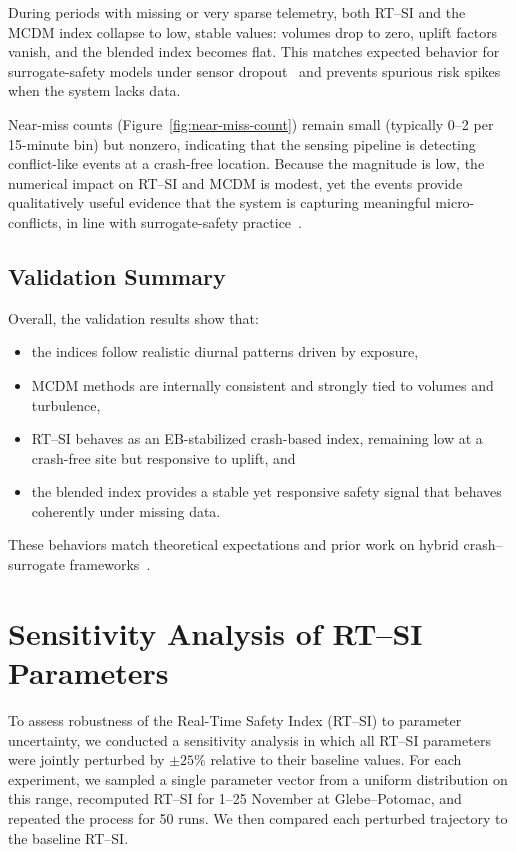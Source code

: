 \documentclass[conference]{IEEEtran}
\begin{document}
During periods with missing or very sparse telemetry, both RT--SI and the MCDM index
collapse to low, stable values: volumes drop to zero, uplift factors vanish, and the
blended index becomes flat. This matches expected behavior for surrogate-safety models
under sensor dropout~\cite{gettman2003ssam} and prevents spurious risk spikes when the
system lacks data.

Near-miss counts (Figure~\ref{fig:near-miss-count}) remain small (typically 0--2 per
15-minute bin) but nonzero, indicating that the sensing pipeline is detecting
conflict-like events at a crash-free location. Because the magnitude is low, the
numerical impact on RT--SI and MCDM is modest, yet the events provide qualitatively
useful evidence that the system is capturing meaningful micro-conflicts, in line with
surrogate-safety practice~\cite{schultz2025_surrogate, gettman2003ssam}.

\subsection{Validation Summary}

Overall, the validation results show that:
\begin{itemize}
    \item the indices follow realistic diurnal patterns driven by exposure,
    \item MCDM methods are internally consistent and strongly tied to volumes and
          turbulence,
    \item RT--SI behaves as an EB-stabilized crash-based index, remaining low at a
          crash-free site but responsive to uplift, and
    \item the blended index provides a stable yet responsive safety signal that
          behaves coherently under missing data.
\end{itemize}
These behaviors match theoretical expectations and prior work on hybrid
crash–surrogate frameworks~\cite{persaud2007, montella2020systemic, schultz2025_surrogate}.

\section{Sensitivity Analysis of RT--SI Parameters}
\label{sec:sensitivity}

To assess robustness of the Real-Time Safety Index (RT--SI) to parameter uncertainty,
we conducted a sensitivity analysis in which all RT--SI parameters were jointly
perturbed by $\pm 25\%$ relative to their baseline values. For each experiment, we
sampled a single parameter vector from a uniform distribution on this range, recomputed
RT--SI for 1--25 November at Glebe--Potomac, and repeated the process for 50 runs.
We then compared each perturbed trajectory to the baseline RT--SI.
\end{document}
